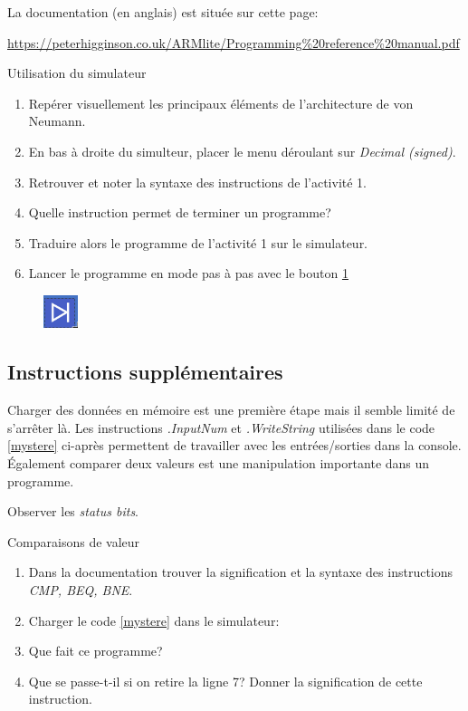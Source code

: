 \documentclass[a4paper,11pt]{article}
\begin{document}
\begin{Form}
\begin{activite}
\begin{enumerate}
\end{enumerate}
\end{activite}
La documentation (en anglais) est située sur cette page:
\begin{center}
\url{https://peterhigginson.co.uk/ARMlite/Programming%20reference%20manual.pdf}
\end{center}
\begin{activite} Utilisation du simulateur
\begin{enumerate}
\item Repérer visuellement les principaux éléments de l'architecture de von Neumann.
\item En bas à droite du simulteur, placer le menu déroulant sur \emph{Decimal (signed)}.
\item Retrouver et noter la syntaxe des instructions de l'activité 1.
\item Quelle instruction permet de terminer un programme?
\item Traduire alors le programme de l'activité 1 sur le simulateur.
\item Lancer le programme en mode pas à pas avec le bouton \ref{pasapas}
\end{enumerate}
\end{activite}
\begin{figure}[!h]
\centering
\includegraphics[width=1cm]{ressources/pasapas.png}
\label{pasapas}
\end{figure}
\subsection{Instructions supplémentaires}
Charger des données en mémoire est une première étape mais il semble limité de s'arrêter là. Les instructions \emph{.InputNum} et \emph{.WriteString} utilisées dans le code \ref{mystere} ci-après permettent de travailler avec les entrées/sorties dans la console.\\Également comparer deux valeurs est une manipulation importante dans un programme.
\begin{commentprof}
Observer les \emph{status bits}.
\end{commentprof}
\begin{activite}
Comparaisons de valeur
\begin{enumerate}
\item Dans la documentation trouver la signification et la syntaxe des instructions \emph{CMP, BEQ, BNE}.
\item Charger le code \ref{mystere} dans le simulateur:

\item Que fait ce programme?
\item Que se passe-t-il si on retire la ligne 7? Donner la signification de cette instruction.
\end{enumerate}
\end{activite}

\end{Form}
\end{document}
